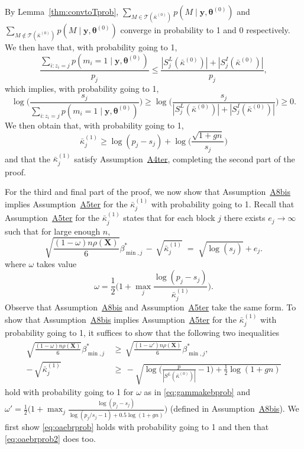 \documentclass[
  12pt]{article}
\newcommand{\T}{\mathcal{T}}
\newcommand{\by}{\mathbf{y}}
\newcommand{\btheta}{\boldsymbol{\theta}}
\newcommand{\bX}{\mathbf{X}}
\begin{document}
By Lemma~\ref{thm:convtoTprob}, $\sum_{M \in \T(\bar{\kappa}^{(0)})}p(M\mid \by, \btheta^{(0)})$ and $\sum_{M \not\in \T(\bar{\kappa}^{(0)})}p(M\mid \by, \btheta^{(0)})$ converge in probability to 1 and 0 respectively. We then have that, with probability going to 1,
\begin{equation*}
    \frac{\sum_{i:z_i=j}p(m_i=1 \mid \by, \btheta^{(0)}) }{p_j}\leq \frac{|S^{L}_j(\bar{\kappa}^{(0)})|+|S^{I}_j(\bar{\kappa}^{(0)})|}{p_j},
\end{equation*}
which implies, with probability going to 1,
$$\log\Big(\frac{s_j}{\sum_{i:z_i=j}p(m_i=1 \mid \by, \btheta^{(0)}) }\Big)\geq \log\bigg(\frac{s_j}{|S^{L}_j(\bar{\kappa}^{(0)})|+|S^{I}_j(\bar{\kappa}^{(0)})|} \bigg) \geq 0.$$
We then obtain that, with probability going to 1,
\begin{equation}\label{eq:eeeeeeehprob}
    \bar{\kappa}^{(1)}_j
    \geq  \log(p_j-s_j)+\log\Big(\frac{\sqrt{1+gn}}{s_j}\Big)
\end{equation}
and that the $\bar{\kappa}^{(1)}_j$ satisfy Assumption~\hyperlink{lab:A4ter}{A4ter}, completing the second part of the proof.\medskip

For the third and final part of the proof, 
we now show that Assumption~\hyperlink{lab:A8bis}{A8bis} implies Assumption~\hyperlink{lab:A5ter}{A5ter} for the $\bar{\kappa}_j^{(1)}$ with probability going to 1. Recall that Assumption~\hyperlink{lab:A5ter}{A5ter} for the $\bar{\kappa}_j^{(1)}$ states that for each block $j$ there exists $e_j\to \infty$ such that for large enough $n$,
    \begin{equation*}
        \sqrt{\frac{(1-\omega) n \rho(\bX)}{6}}{{\beta_{\min,j}^*}} \,- \,\sqrt{\bar{\kappa}^{(1)}_j} \;=\; \sqrt{\log(s_j)} + e_j .
    \end{equation*}
where $\omega$ takes value
\begin{equation}\label{eq:gammakebprob}
    \omega=\frac12\Big(1+\max_j\frac{\log(p_j-s_j)}{\bar{\kappa}^{(1)}_j}\Big).
\end{equation}
Observe that Assumption~\hyperlink{lab:A8bis}{A8bis} and Assumption~\hyperlink{lab:A5ter}{A5ter} take the same form. To show that Assumption~\hyperlink{lab:A8bis}{A8bis} implies Assumption~\hyperlink{lab:A5ter}{A5ter} for the $\bar{\kappa}_j^{(1)}$ with probability going to 1, it suffices to show that the following two inequalities
\begin{align}
    \sqrt{\frac{ (1-\omega)n\rho(\bX)}{6}}{\beta_{\min,j}^*} \,&\geq \,  \sqrt{\frac{ (1-\omega')n\rho(\bX)}{6}}{\beta_{\min,j}^*}, \label{eq:oaebrprob} \\
    - \,\sqrt{\bar{\kappa}^{(1)}_j} \,&\geq \,-\sqrt{\log\bigg(\frac{p}{|S^{L}(\bar{\kappa}^{(0)})|}-1\bigg)+\frac12\log(1+gn)}\label{eq:oaebrprob2}
\end{align}
hold with probability going to 1 for $\omega$ as in \eqref{eq:gammakebprob} and $\omega'=\frac12\big(1+\max_j \frac{\log(p_j-s_j)}{\log(p_j/s_j-1)+0.5\log(1+gn)}\big)$ (defined in Assumption~\hyperlink{lab:A8bis}{A8bis}). We first show \eqref{eq:oaebrprob} holds with probability going to 1 and then that \eqref{eq:oaebrprob2} does too.
\end{document}

